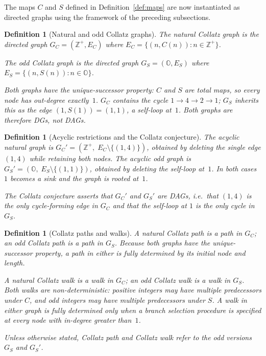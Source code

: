 \documentclass[11pt,a4paper]{article}
\newtheorem{definition}[theorem]{Definition}
\theoremstyle{remark}
\theoremstyle{plain}
\begin{document}
The maps $C$ and $S$ defined in Definition~\ref{def:maps} are now instantiated as
directed graphs using the framework of the preceding subsections.

\begin{definition}[Natural and odd Collatz graphs]
The \emph{natural Collatz graph} is the directed graph
$G_C = (\mathbb{Z}^+, E_C)$ where $E_C = \{(n, C(n)) : n \in \mathbb{Z}^+\}$.

The \emph{odd Collatz graph} is the directed graph
$G_S = (\mathbb{O}, E_S)$ where $E_S = \{(n, S(n)) : n \in \mathbb{O}\}$.

Both graphs have the unique-successor property: $C$ and $S$ are total maps, so every
node has out-degree exactly~$1$.
$G_C$ contains the cycle $1 \to 4 \to 2 \to 1$; $G_S$ inherits this
as the edge $(1, S(1)) = (1, 1)$, a self-loop at~$1$.
Both graphs are therefore DGs, not DAGs.
\end{definition}

\begin{definition}[Acyclic restrictions and the Collatz conjecture]\label{def:acyclic}
The \emph{acyclic natural graph} is $G_C' = (\mathbb{Z}^+,\; E_C \setminus \{(1,4)\})$,
obtained by deleting the single edge $(1, 4)$ while retaining both nodes.
The \emph{acyclic odd graph} is $G_S' = (\mathbb{O},\; E_S \setminus \{(1,1)\})$,
obtained by deleting the self-loop at~$1$.
In both cases $1$ becomes a sink and the graph is rooted at~$1$.

The \emph{Collatz conjecture} asserts that $G_C'$ and $G_S'$ are DAGs,
i.e.\ that $(1,4)$ is the \emph{only} cycle-forming edge in $G_C$ and that
the self-loop at $1$ is the only cycle in $G_S$.
\end{definition}

\begin{definition}[Collatz paths and walks]
A \emph{natural Collatz path} is a path in $G_C$; an \emph{odd Collatz path}
is a path in $G_S$.
Because both graphs have the unique-successor property, a path in either is fully
determined by its initial node and length.

A \emph{natural Collatz walk} is a walk in $G_C$; an \emph{odd Collatz walk}
is a walk in $G_S$.
Both walks are non-deterministic: positive integers may have multiple predecessors
under $C$, and odd integers may have multiple predecessors under $S$.
A walk in either graph is fully determined only when a branch selection procedure is
specified at every node with in-degree greater than~$1$.

Unless otherwise stated, \emph{Collatz path} and \emph{Collatz walk} refer to the
odd versions $G_S$ and $G_S'$.
\end{definition}
\end{document}
